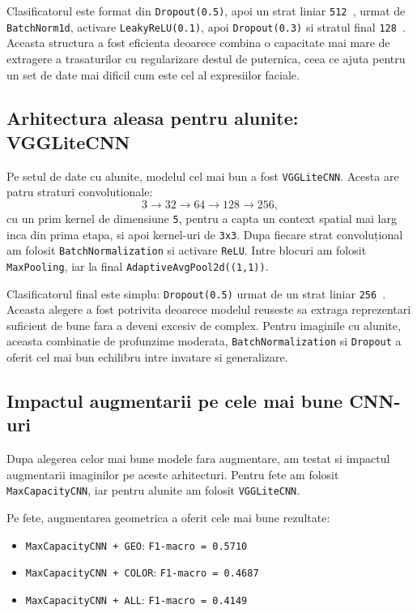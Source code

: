 \documentclass[12pt,a4paper]{article}
\begin{document}
Clasificatorul este format din \texttt{Dropout(0.5)}, apoi un strat liniar \texttt{512 }, urmat de \texttt{BatchNorm1d}, activare \texttt{LeakyReLU(0.1)}, apoi \texttt{Dropout(0.3)} si stratul final \texttt{128 }. Aceasta structura a fost eficienta deoarece combina o capacitate mai mare de extragere a trasaturilor cu regularizare destul de puternica, ceea ce ajuta pentru un set de date mai dificil cum este cel al expresiilor faciale.

\subsection{Arhitectura aleasa pentru alunite: VGGLiteCNN}

Pe setul de date cu alunite, modelul cel mai bun a fost \texttt{VGGLiteCNN}. Acesta are patru straturi convolutionale:
\[
3 \rightarrow 32 \rightarrow 64 \rightarrow 128 \rightarrow 256,
\]
cu un prim kernel de dimensiune \texttt{5}, pentru a capta un context spatial mai larg inca din prima etapa, si apoi kernel-uri de \texttt{3x3}. Dupa fiecare strat convoluțional am folosit \texttt{BatchNormalization} si activare \texttt{ReLU}. Intre blocuri am folosit \texttt{MaxPooling}, iar la final \texttt{AdaptiveAvgPool2d((1,1))}.

Clasificatorul final este simplu: \texttt{Dropout(0.5)} urmat de un strat liniar \texttt{256 }. Aceasta alegere a fost potrivita deoarece modelul reuseste sa extraga reprezentari suficient de bune fara a deveni excesiv de complex. Pentru imaginile cu alunite, aceasta combinatie de profunzime moderata, \texttt{BatchNormalization} si \texttt{Dropout} a oferit cel mai bun echilibru intre invatare si generalizare.

\subsection{Impactul augmentarii pe cele mai bune CNN-uri}

Dupa alegerea celor mai bune modele fara augmentare, am testat si impactul augmentarii imaginilor pe aceste arhitecturi. Pentru fete am folosit \texttt{MaxCapacityCNN}, iar pentru alunite am folosit \texttt{VGGLiteCNN}.

Pe fete, augmentarea geometrica a oferit cele mai bune rezultate:
\begin{itemize}
    \item \texttt{MaxCapacityCNN + GEO}: \texttt{F1-macro = 0.5710}
    \item \texttt{MaxCapacityCNN + COLOR}: \texttt{F1-macro = 0.4687}
    \item \texttt{MaxCapacityCNN + ALL}: \texttt{F1-macro = 0.4149}
\end{itemize}
\end{document}
